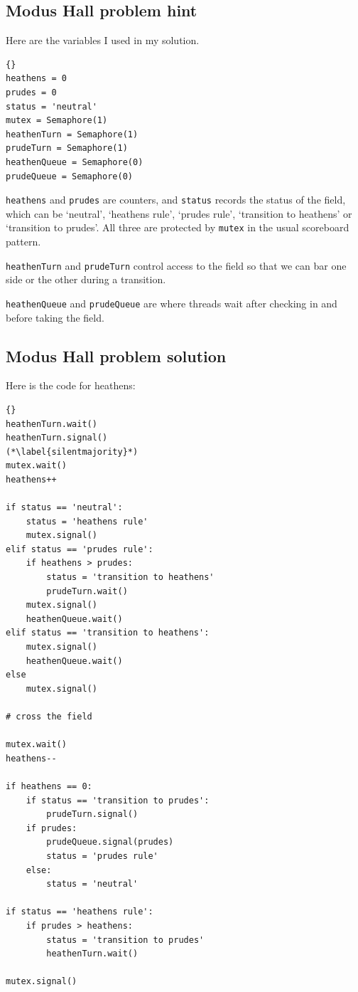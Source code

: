 \documentclass{book}
\begin{document}
\subsection {Modus Hall problem hint}

Here are the variables I used in my solution.

\begin{lstlisting}[title={Modus problem hint}]{}
heathens = 0
prudes = 0
status = 'neutral'
mutex = Semaphore(1)
heathenTurn = Semaphore(1)
prudeTurn = Semaphore(1)
heathenQueue = Semaphore(0)
prudeQueue = Semaphore(0)
\end{lstlisting}

{\tt heathens} and {\tt prudes} are counters, and {\tt status} records
the status of the field, which can be `neutral', `heathens rule',
`prudes rule', `transition to heathens' or `transition to prudes'.
All three are protected by {\tt mutex} in the usual scoreboard
pattern.

    {\tt heathenTurn} and {\tt prudeTurn} control access to the field
so that we can bar one side or the other during a transition.

    {\tt heathenQueue} and {\tt prudeQueue} are where threads wait after
checking in and before taking the field.



\subsection {Modus Hall problem solution}

Here is the code for heathens:

\begin{lstlisting}[title={Modus problem solution}]{}
heathenTurn.wait()
heathenTurn.signal()
(*\label{silentmajority}*)
mutex.wait()
heathens++

if status == 'neutral':
    status = 'heathens rule'
    mutex.signal()
elif status == 'prudes rule':
    if heathens > prudes:
        status = 'transition to heathens'
        prudeTurn.wait()
    mutex.signal()
    heathenQueue.wait()
elif status == 'transition to heathens':
    mutex.signal()
    heathenQueue.wait()
else
    mutex.signal()

# cross the field

mutex.wait()
heathens--

if heathens == 0:
    if status == 'transition to prudes':
        prudeTurn.signal()
    if prudes:
        prudeQueue.signal(prudes)
        status = 'prudes rule'
    else:
        status = 'neutral'
        
if status == 'heathens rule':
    if prudes > heathens:
        status = 'transition to prudes'
        heathenTurn.wait()

mutex.signal()
\end{lstlisting}
\end{document}
